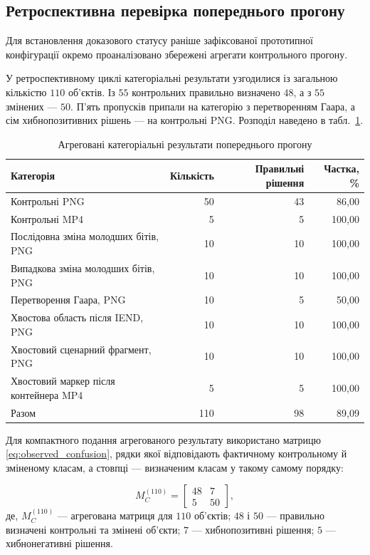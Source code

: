 \subsection{Ретроспективна перевірка попереднього прогону}

Для встановлення доказового статусу раніше зафіксованої прототипної конфігурації окремо проаналізовано збережені агрегати контрольного прогону.

У ретроспективному циклі категоріальні результати узгодилися із загальною кількістю $110$ об’єктів. Із $55$ контрольних правильно визначено $48$, а з $55$ змінених --- $50$. П’ять пропусків припали на категорію з перетворенням Гаара, а сім хибнопозитивних рішень --- на контрольні PNG. Розподіл наведено в табл.~\ref{tab:ch4_group_results}.

\begin{table}[htbp]
\caption{Агреговані категоріальні результати попереднього прогону}
\label{tab:ch4_group_results}
\centering
\small
\begin{tabular}{lrrr}
\toprule
Категорія & Кількість & Правильні рішення & Частка, \% \\
\midrule
Контрольні PNG & 50 & 43 & 86,00 \\
Контрольні MP4 & 5 & 5 & 100,00 \\
Послідовна зміна молодших бітів, PNG & 10 & 10 & 100,00 \\
Випадкова зміна молодших бітів, PNG & 10 & 10 & 100,00 \\
Перетворення Гаара, PNG & 10 & 5 & 50,00 \\
Хвостова область після IEND, PNG & 10 & 10 & 100,00 \\
Хвостовий сценарний фрагмент, PNG & 10 & 10 & 100,00 \\
Хвостовий маркер після контейнера MP4 & 5 & 5 & 100,00 \\
\midrule
Разом & 110 & 98 & 89,09 \\
\bottomrule
\end{tabular}
\end{table}

Для компактного подання агрегованого результату використано матрицю \eqref{eq:observed_confusion}, рядки якої відповідають фактичному контрольному й зміненому класам, а стовпці --- визначеним класам у такому самому порядку:

\begin{equation}
M_C^{(110)}=
\begin{bmatrix}
48 & 7\\
5 & 50
\end{bmatrix},
\label{eq:observed_confusion}
\end{equation}
де, $M_C^{(110)}$ --- агрегована матриця для $110$ об’єктів; $48$ і $50$ --- правильно визначені контрольні та змінені об’єкти; $7$ --- хибнопозитивні рішення; $5$ --- хибнонегативні рішення.

